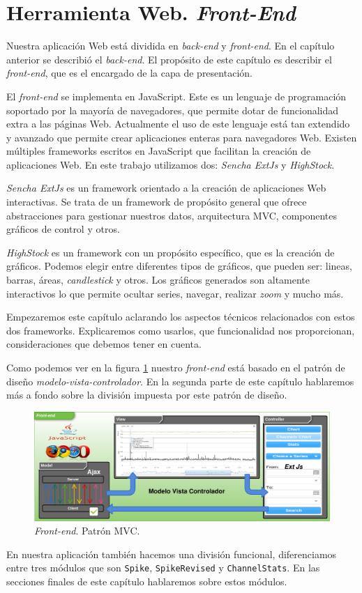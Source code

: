 \chapter{Herramienta Web. \emph{Front-End}}
\label{frontend}
Nuestra aplicación Web está dividida en \emph{back-end} y \emph{front-end}. En el capítulo anterior se describió el \emph{back-end}. El propósito de
este capítulo es describir el \emph{front-end}, que es el encargado de la capa de presentación.
\par
El \emph{front-end} se implementa en JavaScript\cite{JavaScript}. Este es un lenguaje de programación soportado por la mayoría de navegadores, que
permite dotar de funcionalidad extra a las páginas Web. Actualmente el uso de este lenguaje está tan extendido y avanzado que permite crear
aplicaciones enteras para navegadores Web. Existen múltiples frameworks escritos en JavaScript que facilitan la creación de aplicaciones Web. En este
trabajo utilizamos dos: \emph{Sencha ExtJs}\cite{ExtJs} y \emph{HighStock}\cite{HighStock}.
\par
\emph{Sencha ExtJs} es un framework orientado a la creación de aplicaciones Web interactivas. Se trata de un framework de propósito general que ofrece
abstracciones para gestionar nuestros datos, arquitectura MVC, componentes gráficos de control y otros. 
\par
\emph{HighStock} es un framework con un propósito específico, que es la creación de gráficos. Podemos elegir entre diferentes tipos de gráficos, que pueden
ser: lineas, barras, áreas, \emph{candlestick} y otros. Los gráficos generados son altamente interactivos lo que permite ocultar series, navegar,
realizar \emph{zoom} y mucho más.
\par
Empezaremos este capítulo aclarando los aspectos técnicos relacionados con estos dos frameworks. Explicaremos como usarlos, que funcionalidad nos
proporcionan, consideraciones que debemos tener en cuenta.
\par
Como podemos ver en la figura \ref{frontend} nuestro \emph{front-end} está basado en el patrón de diseño
\emph{modelo-vista-controlador}\cite{MVCWiki}. En la segunda parte de este capítulo hablaremos más a fondo sobre la división impuesta por este patrón
de diseño.
\begin{figure}[h]
	\centering
	\includegraphics[keepaspectratio, width=1\textwidth]{./img/frontend.png}
	\caption{\emph{Front-end}. Patrón MVC.}   
	\label{fig:frontend}
\end{figure}
\par
En nuestra aplicación también hacemos una división funcional, diferenciamos entre tres módulos que son \texttt{Spike}, \texttt{SpikeRevised} y
\texttt{ChannelStats}. En las secciones finales de este capítulo hablaremos sobre estos módulos. 

